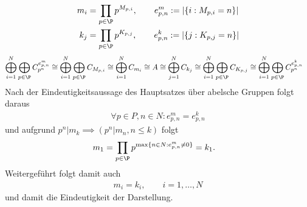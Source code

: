 \begin{solution}
\begin{align*}
  m_i &= \prod_{p \in \P}p^{M_{p,i}}, \qquad e^m_{p,n} := |\{i: M_{p,i} = n\}| \\
  k_j &= \prod_{p \in \P} p^{K_{p,j}}, \qquad e^k_{p,n} := |\{j: K_{p,j} = n\}|
\end{align*}
\begin{align*}
\bigoplus_{i = 1}^{N}\bigoplus_{p \in \P}C_{p^n}^{e^m_{p,n}} &\cong
\bigoplus_{i = 1}^{N}\bigoplus_{p \in \P}C_{M_{p,i}} \cong
\bigoplus_{i = 1}^{N} C_{m_i} \cong A \cong \bigoplus_{j = 1}^{N} C_{k_j}
\cong \bigoplus_{i = 1}^{N}\bigoplus_{p \in \P}C_{K_{p,j}}
\cong \bigoplus_{i = 1}^{N}\bigoplus_{p \in \P}C_{p^n}^{e^k_{p,n}}
\end{align*}
Nach der Eindeutigkeitsaussage des Hauptsatzes über abelsche Gruppen folgt daraus
\begin{align*}
  \forall p \in P, n \in N: e^m_{p,n} = e^k_{p,n}
\end{align*}
und aufgrund $p^n | m_k \implies (p^n | m_n, n \leq k)$ folgt
\begin{align*}
  m_1 &= \prod_{p \in \P}p^{\max\{n \in N: e^m_{p,n} \neq 0\}} = k_1.
\end{align*}
Weitergeführt folgt damit auch
\begin{align*}
  m_i = k_i, \qquad i = 1,\dots,N
\end{align*}
und damit die Eindeutigkeit der Darstellung.
\end{solution}

